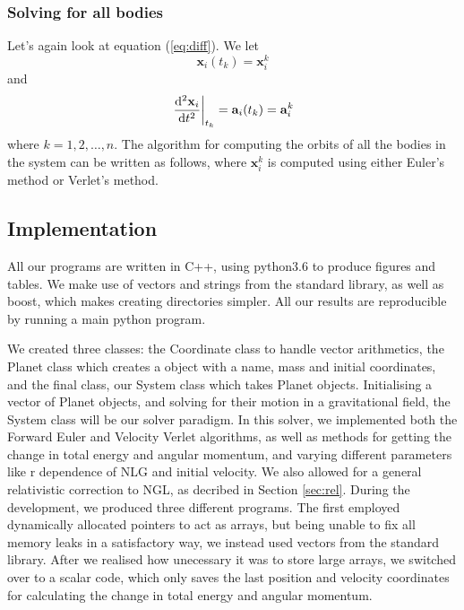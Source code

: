 \subsubsection{Solving for all bodies}
Let's again look at equation (\ref{eq:diff}). We let
\begin{equation}
\mathbf{x}_i(t_k)=\mathbf{x}_{i}^k
\end{equation}
and
\begin{equation}
\left.\dv[2]{\mathbf{x}_i}{t}\right\rvert_{t_k} = \mathbf{a}_i(t_k)=\mathbf{a}_{i}^k
\end{equation}
where $k=1,2,\ldots,n$. The algorithm for computing the orbits of all the bodies in the system can be written as follows, where $\mathbf{x}_{i}^k$ is computed using either Euler's method or Verlet's method.
\begin{algorithm}[h!]
	\SetAlgoLined
\end{algorithm}

\subsection{Implementation}
All our programs are written in C++, using python3.6 to produce figures and tables.
We make use of vectors and strings from the standard library, as well as boost,
which makes creating directories simpler. All our results are reproducible
by running a main python program.

We created three classes: the Coordinate class to handle vector arithmetics, the Planet
class which creates a object with a name, mass and initial coordinates,
and the final class, our System class which takes Planet objects. Initialising
a vector of Planet objects, and solving for their motion in a gravitational field, the System
class will be our solver paradigm. In this solver, we implemented both the Forward Euler and
Velocity Verlet algorithms, as well as methods for getting the change in total energy and angular
momentum, and varying different parameters like r dependence of NLG and initial velocity.
We also allowed for a general relativistic correction to NGL, as decribed in Section \ref{sec:rel}.
During the development, we produced three different programs. The first employed dynamically allocated pointers to act as arrays, but being unable to fix all memory leaks in a satisfactory way, we instead used vectors from the standard library.
After we realised how unecessary it was to store large arrays, we switched over to a scalar code, which only saves the last position and velocity coordinates for calculating the change in total energy and angular momentum.

